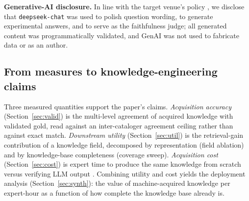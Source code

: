 \textbf{Generative-AI disclosure.} In line with the target venue's policy
, we disclose that \texttt{deepseek-chat} was
used to polish question wording, to generate experimental answers, and to
serve as the faithfulness judge; all generated content was programmatically
validated, and GenAI was not used to fabricate data or as an author.

\subsection{From measures to knowledge-engineering claims}
\label{sec:method:from-measures}

Three measured quantities support the paper's claims. \emph{Acquisition
accuracy} (Section~\ref{sec:valid}) is the multi-level agreement of acquired
knowledge with validated gold, read against an inter-cataloger agreement
ceiling rather than against exact match. \emph{Downstream utility}
(Section~\ref{sec:util}) is the retrieval-gain contribution of a knowledge
field, decomposed by representation (field ablation) and by knowledge-base
completeness (coverage sweep). \emph{Acquisition cost}
(Section~\ref{sec:cost}) is expert time to produce the same knowledge from
scratch versus verifying LLM output . Combining utility and cost
yields the deployment analysis (Section~\ref{sec:synth}): the value of
machine-acquired knowledge per expert-hour as a function of how complete the
knowledge base already is.
